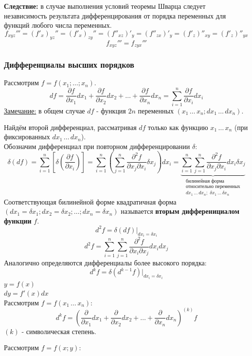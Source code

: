 \documentclass[12pt]{article}
\begin{document}
    \textbf{Следствие:} в случае выполнения условий теоремы Шварца следует независимость результата дифференцирования от порядка переменных для функций любого числа переменных.
    \[ f_{xyz}''' = (f'_x)_{yz}'' = (f'_x)_{zy}'' = (f''_{xz})'_y = (f''_{zx})'_y = (f'_z)''_{xy} = (f'_z)''_{yx} \]
    \[ f_{xyz}''' = f_{zyx}''' \]
    \subsubsection*{Дифференциалы высших порядков}
    Рассмотрим $f = f(x_1; \dots; x_n)$.
    \[ df = \frac{\partial f}{\partial x_1}dx_1 + \frac{\partial f}{\partial x_2}dx_2 + \dots + \frac{\partial f}{\partial x_n}dx_n = \sum_{i=1}^{n}\frac{\partial f}{\partial x_i}dx_i \]
    \underline{Замечание:} в общем случае $df$ - функция $2n$ переменных $(x_1\, \dots\, x_n; dx_1\, \dots\, dx_n)$.\par\noindent
    Найдём второй дифференциал, рассматривая $df$ только как функцию $x_1\, \dots\, x_n$ (при фиксированных $dx_1\, \dots\, dx_n$).\\
    Обозначим дифференциал при повторном дифференцировании $\delta$:
    \[ \delta(df) = \sum_{i=1}^{n}\left[ \delta(\frac{\partial f}{\partial x_i}) \right] = \sum_{i=1}^{n} ( \sum_{j=1}^{n} \frac{\partial^2 f}{\partial x_j \partial x_i} \delta x_j )dx_i = \underbrace{\sum_{i=1}^{n} \sum_{j=1}^{n} \frac{\partial^2 f}{\partial x_j \partial x_i} dx_i \delta x_j}_{\substack{\text{билинейная форма} \\ \text{относительно переменных} \\ dx_1\, \dots\, dx_n;\,\, \delta x_1\, \dots\, \delta x_n}} \]
    Соответствующая билинейной форме квадратичная форма $(dx_1 = \delta x_1; dx_2 = \delta x_2; \dots; dx_n = \delta x_n)$ называется \textbf{вторым дифференициалом функции} $f$.
    \[ d^2 f = \delta (df) \Big|_{dx_i = \delta x_i} \]
    \[ d^2 f = \sum_{i=1}^{n} \sum_{j=1}^{n} \frac{\partial^2 f}{\partial x_i \partial x_j} dx_i dx_j \]
    Аналогично определяются дифференциалы более высокого порядка:
    \[ d^k f = \delta(d^{k-1}f)\Big|_{dx_i = \delta x_i} \]
    $y = f(x)$\\
    $dy = f'(x)dx$\\
    Рассмотрим $f = f(x_1\, \dots\, x_n)$:
    \[ d^k f = \left( \frac{\partial}{\partial x_1} dx_1 + \frac{\partial}{\partial x_2} dx_2 + \dots + \frac{\partial}{\partial x_n} dx_n \right)^{(k)}f \]
    $(k)$ - символическая степень.\par\noindent
    Рассмотрим $f = f(x;y)$:
\end{document}
